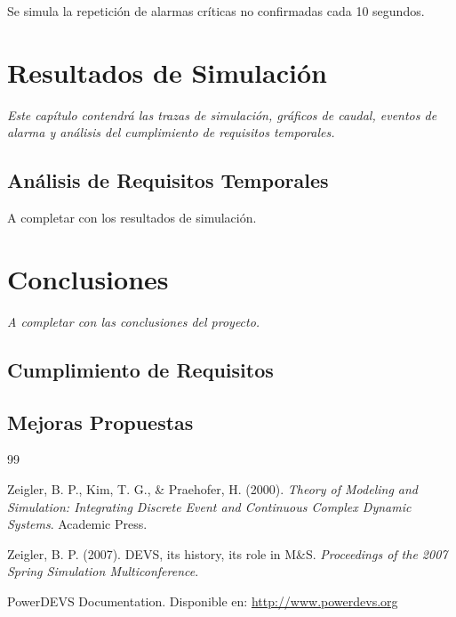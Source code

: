 \documentclass[12pt,a4paper,oneside]{report}
\begin{document}
Se simula la repetición de alarmas críticas no confirmadas cada 10 segundos.

\chapter{Resultados de Simulación}

\textit{Este capítulo contendrá las trazas de simulación, gráficos de caudal, eventos de alarma y análisis del cumplimiento de requisitos temporales.}

\section{Análisis de Requisitos Temporales}

A completar con los resultados de simulación.

\chapter{Conclusiones}

\textit{A completar con las conclusiones del proyecto.}

\section{Cumplimiento de Requisitos}

\section{Mejoras Propuestas}

\begin{thebibliography}{99}

Zeigler, B. P., Kim, T. G., \& Praehofer, H. (2000). \textit{Theory of Modeling and Simulation: Integrating Discrete Event and Continuous Complex Dynamic Systems}. Academic Press.

Zeigler, B. P. (2007). DEVS, its history, its role in M\&S. \textit{Proceedings of the 2007 Spring Simulation Multiconference}.

PowerDEVS Documentation. Disponible en: \url{http://www.powerdevs.org}

\end{thebibliography}
\end{document}
